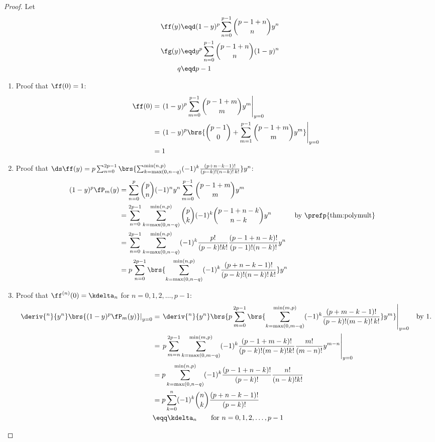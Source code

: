\begin{proof}
Let
\begin{align*}
  \ff(y) &\eqd (1-y)^p \sum_{n=0}^{p-1} {p-1+n \choose n} y^n      \\
  \fg(y) &\eqd y^p     \sum_{n=0}^{p-1} {p-1+n \choose n} (1-y)^n  \\
  q      &\eqd p-1
\end{align*}
  \begin{enumerate}
  \item Proof that $\ff(0)=1$:
  \begin{align*}
  \ff(0)
    &= \left.(1-y)^p \sum_{m=0}^{p-1} {p-1+m\choose m} y^m \right|_{y=0}
  \\&= \left.(1-y)^p \brs{{p-1 \choose 0} + \sum_{m=1}^{p-1} {p-1+m\choose m} y^m}\right|_{y=0}
  \\&= 1
  \end{align*}

  \item Proof that
      $\ds\ff(y)=
       p \sum_{n=0}^{2p-1}
       \brs{\sum_{k=\max(0,n-q)}^{\min(n,p)} (-1)^k \frac{(p+n-k-1)!}{(p-k)!(n-k)!\,k!}}
       y^n$:
  \begin{align*}
  (1-y)^p \fP_m(y)
    &= \sum_{n=0}^p     {p\choose n} (-1)^n y^n
       \sum_{m=0}^{p-1} {p-1+m\choose m} y^m
  \\&= \sum_{n=0}^{2p-1} \sum_{k=\max(0,n-q)}^{\min(n,p)}
       {p\choose k} (-1)^k {p-1+n-k\choose n-k} y^n
    && \text{by \prefp{thm:polymult}}
  \\&= \sum_{n=0}^{2p-1} \sum_{k=\max(0,n-q)}^{\min(n,p)}
       (-1)^k \frac{p!}{(p-k)!k!} \frac{(p-1+n-k)!}{(p-1)!(n-k)!} y^n
  \\&= p \sum_{n=0}^{2p-1}
       \brs{\sum_{k=\max(0,n-q)}^{\min(n,p)} (-1)^k \frac{(p+n-k-1)!}{(p-k)!(n-k)!\,k!}}
       y^n
  \end{align*}

  \item Proof that $\ff^{(n)}(0)=\kdelta_n$ for $n=0,1,2,\ldots,p-1$:
  \begin{align*}
  \left.\deriv{^n}{y^n}\brs{ (1-y)^p \fP_m(y) }\right|_{y=0}
    &= \left.
       \deriv{^n}{y^n}\brs{
         p \sum_{m=0}^{2p-1}
         \brs{\sum_{k=\max(0,m-q)}^{\min(m,p)} (-1)^k \frac{(p+m-k-1)!}{(p-k)!(m-k)!\,k!}}
         y^m
       }
       \right|_{y=0}
    && \text{by 1.}
  \\&= \left. p
       \sum_{m=n}^{2p-1} \sum_{k=\max(0,m-q)}^{\min(m,p)}
       (-1)^k \frac{(p-1+m-k)!}{(p-k)!(m-k)!k!} \frac{m!}{(m-n)!}y^{m-n}
       \right|_{y=0}
  \\&= p \sum_{k=\max(0,n-q)}^{\min(n,p)}
       (-1)^k \frac{(p-1+n-k)!}{(p-k)!} \frac{n!}{(n-k)!k!}
  \\&= p \sum_{k=0}^n
       (-1)^k {n\choose k} \frac{(p+n-k-1)!}{(p-k)!}
  \\&\eqq \kdelta_n \qquad\text{for } n=0,1,2,\ldots,p-1
  \end{align*}


\end{enumerate}
\end{proof}
